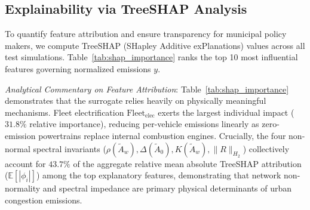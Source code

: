 \documentclass[journal]{IEEEtran}
\begin{document}
\subsection{Explainability via TreeSHAP Analysis}
To quantify feature attribution and ensure transparency for municipal policy makers, we compute TreeSHAP (SHapley Additive exPlanations) values \cite{Lundberg2020} across all test simulations. Table~\ref{tab:shap_importance} ranks the top 10 most influential features governing normalized emissions $y$.

\begin{table}[htbp]
\caption{Top 10 Most Influential Features Ranked by Mean Absolute TreeSHAP Value on Normalized Target $y$}
\label{tab:shap_importance}
\centering
{}
\end{table}

\textit{Analytical Commentary on Feature Attribution}:
Table~\ref{tab:shap_importance} demonstrates that the surrogate relies heavily on physically meaningful mechanisms. Fleet electrification $\text{Fleet}_{\text{elec}}$ exerts the largest individual impact ($31.8\%$ relative importance), reducing per-vehicle emissions linearly as zero-emission powertrains replace internal combustion engines. Crucially, the four non-normal spectral invariants ($\rho(\tilde{A}_w), \Delta(\tilde{A}_0), K(\tilde{A}_w), \|R\|_{H_2}$) collectively account for $43.7\%$ of the aggregate relative mean absolute TreeSHAP attribution ($\mathbb{E}[|\phi_i|]$) among the top explanatory features, demonstrating that network non-normality and spectral impedance are primary physical determinants of urban congestion emissions.
\end{document}

